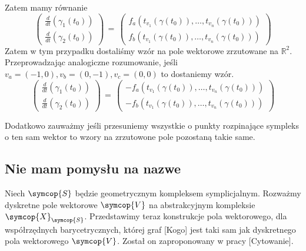 \documentclass[12pt,a4paper]{article}
\begin{document}
Zatem mamy równanie
$$
\begin{pmatrix} 
\frac{d}{dt}(\gamma_1(t_0))  \\
\frac{d}{dt}(\gamma_2(t_0))
\end{pmatrix}
\,
=
\,
\begin{pmatrix} 
f_a({t}_{v_1}(\gamma(t_0)),\ldots,{t}_{v_n}(\gamma(t_0))) \\
f_b({t}_{v_1}(\gamma(t_0)),\ldots,{t}_{v_n}(\gamma(t_0)))
\end{pmatrix}
$$
Zatem w tym przypadku dostaliśmy wzór na pole wektorowe zrzutowane na $\mathbb{R}^2$.
\\
Przeprowadzając analogiczne rozumowanie, jeśli $v_a=(-1,0),v_b=(0,-1),v_c=(0,0)$ to dostaniemy wzór.
$$
\begin{pmatrix} 
\frac{d}{dt}(\gamma_1(t_0))  \\
\frac{d}{dt}(\gamma_2(t_0))
\end{pmatrix}
\,
=
\,
\begin{pmatrix} 
-f_a({t}_{v_1}(\gamma(t_0)),\ldots,{t}_{v_n}(\gamma(t_0))) \\
-f_b({t}_{v_1}(\gamma(t_0)),\ldots,{t}_{v_n}(\gamma(t_0)))
\end{pmatrix}
$$


Dodatkowo zauważmy jeśli przesuniemy wszystkie o punkty rozpinające sympleks o ten sam wektor to wzory na zrzutowone pole pozostaną takie same.
\subsection{Nie mam pomysłu na nazwe}
Niech $\symcop{S}$ będzie geometrycznym kompleksem symplicjalnym. Rozważmy dyskretne pole wektorowe $\symcop{V}$ na abstrakcyjnym kompleksie $\symcop{X}_{\symcop{S}}$. Przedstawimy teraz konstrukcje pola wektorowego, dla współrzędnych barycetrycznych, której graf [Kogo] jest taki sam  jak dyskretnego pola wektorowego $\symcop{V}$. Został on zaproponowany w pracy [Cytowanie].
\end{document}
